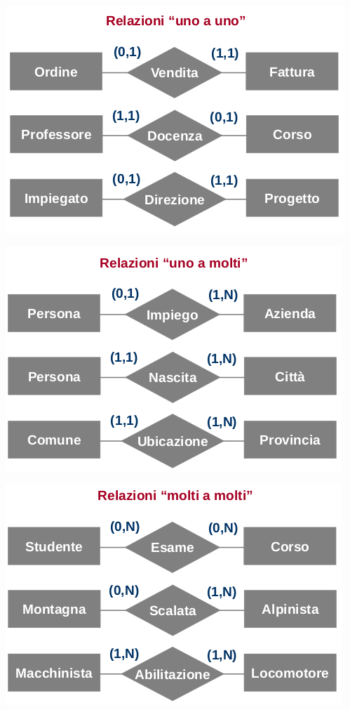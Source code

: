 \documentclass[a4paper,12pt, oneside]{book}
\begin{document}
\begin{center}
\includegraphics[scale=0.6]{img/er7.png}
\end{center}
\begin{center}
\includegraphics[scale=0.6]{img/er6.png}
\end{center}
\begin{center}
\includegraphics[scale=0.6]{img/er5.png}
\end{center}
\end{document}
